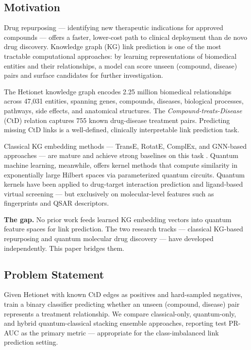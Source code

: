 \documentclass[twocolumn,10pt]{article}
\begin{document}
\subsection{Motivation}

Drug repurposing --- identifying new therapeutic indications for approved compounds --- offers a faster, lower-cost path to clinical deployment than de novo drug discovery. Knowledge graph (KG) link prediction is one of the most tractable computational approaches: by learning representations of biomedical entities and their relationships, a model can score unseen (compound, disease) pairs and surface candidates for further investigation.

The Hetionet knowledge graph \cite{himmelstein2017} encodes 2.25 million biomedical relationships across 47,031 entities, spanning genes, compounds, diseases, biological processes, pathways, side effects, and anatomical structures. The \textit{Compound-treats-Disease} (CtD) relation captures 755 known drug-disease treatment pairs. Predicting missing CtD links is a well-defined, clinically interpretable link prediction task.

Classical KG embedding methods --- TransE, RotatE, ComplEx, and GNN-based approaches --- are mature and achieve strong baselines on this task \cite{mayers2023}. Quantum machine learning, meanwhile, offers kernel methods that compute similarity in exponentially large Hilbert spaces via parameterized quantum circuits. Quantum kernels have been applied to drug-target interaction prediction \cite{qkdti2025} and ligand-based virtual screening \cite{kruger2023} --- but exclusively on molecular-level features such as fingerprints and QSAR descriptors.

\textbf{The gap.} No prior work feeds learned KG embedding vectors into quantum feature spaces for link prediction. The two research tracks --- classical KG-based repurposing and quantum molecular drug discovery --- have developed independently. This paper bridges them.

\subsection{Problem Statement}

Given Hetionet with known CtD edges as positives and hard-sampled negatives, train a binary classifier predicting whether an unseen (compound, disease) pair represents a treatment relationship. We compare classical-only, quantum-only, and hybrid quantum-classical stacking ensemble approaches, reporting test PR-AUC as the primary metric --- appropriate for the class-imbalanced link prediction setting.
\end{document}
